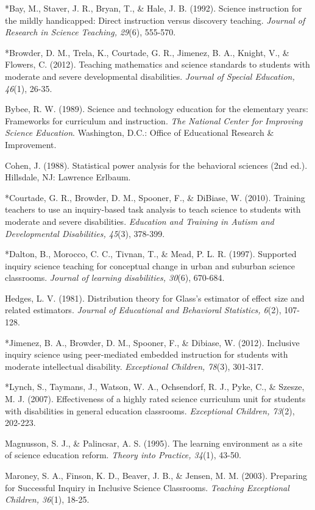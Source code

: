 \documentclass[11.5pt]{sig-alternate} %
\begin{document}
*Bay, M., Staver, J. R., Bryan, T., \& Hale, J. B. (1992). Science instruction for the mildly handicapped: Direct instruction versus discovery teaching. \textit{Journal of Research in Science Teaching, 29}(6), 555-570.

*Browder, D. M., Trela, K., Courtade, G. R., Jimenez, B. A., Knight, V., \& Flowers, C. (2012). Teaching mathematics and science standards to students with moderate and severe developmental disabilities.  \textit{Journal of Special Education, 46}(1), 26-35.

Bybee, R. W. (1989). Science and technology education for the elementary years: Frameworks for curriculum and instruction. \textit{The National Center for Improving Science Education}. Washington, D.C.: Office of Educational Research \& Improvement.

Cohen, J. (1988). Statistical power analysis for the behavioral sciences (2nd ed.).  Hillsdale, NJ: Lawrence Erlbaum.

*Courtade, G. R., Browder, D. M., Spooner, F., \& DiBiase, W. (2010). Training teachers to use an inquiry-based task analysis to teach science to students with moderate and severe disabilities. \textit{Education and Training in Autism and Developmental Disabilities, 45}(3), 378-399.

*Dalton, B., Morocco, C. C., Tivnan, T., \& Mead, P. L. R. (1997). Supported inquiry science teaching for conceptual change in urban and suburban science classrooms. \textit{Journal of learning disabilities, 30}(6), 670-684.

Hedges, L. V. (1981). Distribution theory for Glass's estimator of effect size and related estimators. \textit{Journal of Educational and Behavioral Statistics, 6}(2), 107-128.

*Jimenez, B. A., Browder, D. M., Spooner, F., \& Dibiase, W. (2012). Inclusive inquiry science using peer-mediated embedded instruction for students with moderate intellectual disability. \textit{Exceptional Children, 78}(3), 301-317. 

*Lynch, S., Taymans, J., Watson, W. A., Ochsendorf, R. J., Pyke, C., \& Szesze, M. J. (2007). Effectiveness of a highly rated science curriculum unit for students with disabilities in general education classrooms. \textit{Exceptional Children, 73}(2), 202-223.

Magnusson, S. J., \& Palincsar, A. S. (1995). The learning environment as a site of science education reform. \textit{Theory into Practice, 34}(1), 43-50.

Maroney, S. A., Finson, K. D., Beaver, J. B., \& Jensen, M. M. (2003). Preparing for Successful Inquiry in Inclusive Science Classrooms. \textit{Teaching Exceptional Children, 36}(1), 18-25.
\end{document}
